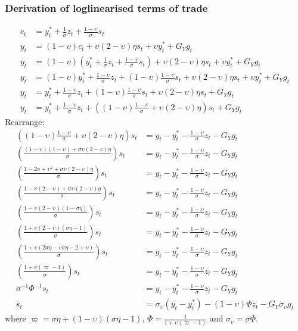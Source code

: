\subsubsection*{Derivation of loglinearised terms of trade}
\begin{align} \label{eq:terms_of_trade_derivation_beginning}
    c_t & = y^*_t + \frac{1}{\sigma}z_t + \frac{1-\upsilon}{\sigma}s_t\\
    y_t &= (1-\upsilon)c_t + \upsilon (2-\upsilon)\eta s_t + \upsilon y^*_t + G_Y g_t\\
    y_t &= (1-\upsilon)\left( y^*_t + \frac{1}{\sigma}z_t + \frac{1-\upsilon}{\sigma}s_t \right) + \upsilon (2-\upsilon)\eta s_t + \upsilon y^*_t + G_Y g_t\\
    y_t &= (1-\upsilon)y^*_t + \frac{1-\upsilon}{\sigma}z_t + (1-\upsilon)\frac{1-\upsilon}{\sigma}s_t + \upsilon (2-\upsilon)\eta s_t + \upsilon y^*_t + G_Y g_t\\
    y_t &= y^*_t + \frac{1-\upsilon}{\sigma}z_t + (1-\upsilon)\frac{1-\upsilon}{\sigma}s_t + \upsilon (2-\upsilon)\eta s_t + G_Y g_t\\
    y_t &= y^*_t + \frac{1-\upsilon}{\sigma}z_t + \left((1-\upsilon)\frac{1-\upsilon}{\sigma} + \upsilon (2-\upsilon)\eta \right) s_t + G_Y g_t
\end{align} 
Rearrange:
\begin{align}   
    \left((1-\upsilon)\frac{1-\upsilon}{\sigma} + \upsilon (2-\upsilon)\eta \right) s_t &= y_t - y^*_t - \frac{1-\upsilon}{\sigma}z_t - G_Y g_t\\
    \left(\frac{(1-\upsilon)(1-\upsilon) + \sigma\upsilon (2-\upsilon)\eta}{\sigma} \right) s_t &= y_t - y^*_t - \frac{1-\upsilon}{\sigma}z_t - G_Y g_t\\
    \left(\frac{1 -2\upsilon + \upsilon^2 + \sigma\upsilon (2-\upsilon)\eta}{\sigma} \right) s_t &= y_t - y^*_t - \frac{1-\upsilon}{\sigma}z_t - G_Y g_t\\
    \left(\frac{1 - \upsilon (2-\upsilon) + \sigma\upsilon (2-\upsilon)\eta}{\sigma} \right) s_t &= y_t - y^*_t - \frac{1-\upsilon}{\sigma}z_t - G_Y g_t\\
    \left(\frac{1 - \upsilon (2-\upsilon)(1-\sigma \eta)}{\sigma} \right) s_t &= y_t - y^*_t - \frac{1-\upsilon}{\sigma}z_t - G_Y g_t\\
    \left(\frac{1 + \upsilon (2-\upsilon)(\sigma \eta - 1)}{\sigma} \right) s_t &= y_t - y^*_t - \frac{1-\upsilon}{\sigma}z_t - G_Y g_t\\
    \left(\frac{1 + \upsilon (2\sigma \eta-\upsilon\sigma \eta -2 + \upsilon)}{\sigma} \right) s_t &= y_t - y^*_t - \frac{1-\upsilon}{\sigma}z_t - G_Y g_t\\
    \left(\frac{1 + \upsilon (\varpi - 1)}{\sigma} \right) s_t &= y_t - y^*_t - \frac{1-\upsilon}{\sigma}z_t - G_Y g_t\\
    \sigma^{-1} \Phi^{-1} s_t &= y_t - y^*_t - \frac{1-\upsilon}{\sigma}z_t - G_Y g_t\\
    s_t &= \sigma_\upsilon(y_t - y^*_t) - (1-\upsilon)\Phi z_t - G_Y \sigma_\upsilon g_t \label{eq:terms_of_trade_derivation_end}
\end{align}
where $\varpi = \sigma \eta + (1-\upsilon)(\sigma \eta - 1)$, $\Phi = \frac{1}{1 + \upsilon (\varpi - 1)}$ and $\sigma_\upsilon = \sigma \Phi$.
\newpage